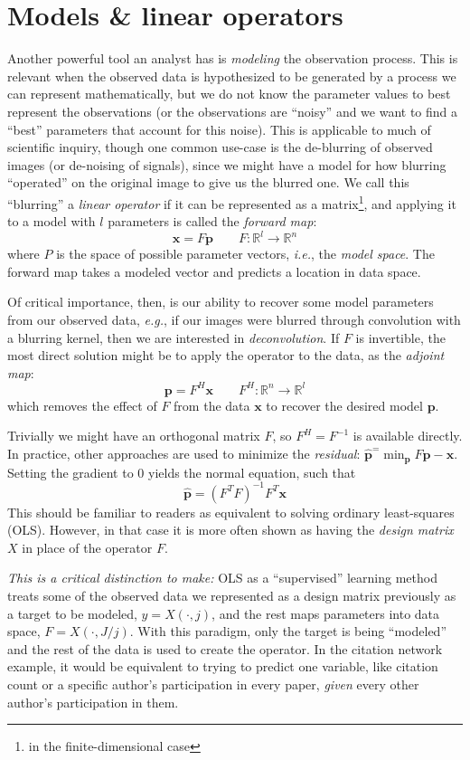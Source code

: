 \documentclass[%
	12pt,
		oneside,
		letterpaper
]{book}
\begin{document}
\section{Models \& linear operators}\label{sec-lin-ops}

Another powerful tool an analyst has is \emph{modeling} the observation process.
This is relevant when the observed data is hypothesized to be generated by a process we can represent mathematically, but we do not know the parameter values to best represent the observations (or the observations are ``noisy'' and we want to find a ``best'' parameters that account for this noise).
This is applicable to much of scientific inquiry, though one common use-case is the de-blurring of observed images (or de-noising of signals), since we might have a model for how blurring ``operated'' on the original image to give us the blurred one.
We call this ``blurring'' a \emph{linear operator} if it can be represented as a matrix\footnote{in the finite-dimensional case}, and applying it to a model with \(l\) parameters is called the \emph{forward map}:
\[\mathbf{x} = F\mathbf{p}\qquad F:\mathbb{R}^{l}\rightarrow \mathbb{R}^n\]
where \(P\) is the space of possible parameter vectors, \emph{i.e.}, the \emph{model space}.
The forward map takes a modeled vector and predicts a location in data space.

Of critical importance, then, is our ability to recover some model parameters from our observed data, \emph{e.g.}, if our images were blurred through convolution with a blurring kernel, then we are interested in \emph{deconvolution}.
If \(F\) is invertible, the most direct solution might be to apply the operator to the data, as the \emph{adjoint map}:
\[ \mathbf{p} = F^H\mathbf{x}\qquad F^H:\mathbb{R}^{n}\rightarrow \mathbb{R}^l\]
which removes the effect of \(F\) from the data \(\mathbf{x}\) to recover the desired model \(\mathbf{p}\).

Trivially we might have an orthogonal matrix \(F\), so \(F^H=F^{-1}\) is available directly.
In practice, other approaches are used to minimize the \emph{residual}: \(\hat{\mathbf{p}}^=\min_{\mathbf{p}} F\mathbf{p}-\mathbf{x}\).
Setting the gradient to 0 yields the normal equation, such that
\[ \hat{\mathbf{p}}=(F^TF)^{-1}F^T\mathbf{x}\]
This should be familiar to readers as equivalent to solving ordinary least-squares (OLS).
However, in that case it is more often shown as having the \emph{design matrix} \(X\) in place of the operator \(F\).

\emph{This is a critical distinction to make:} OLS as a ``supervised'' learning method treats some of the observed data we represented as a design matrix previously as a target to be modeled, \(y=X(\cdot,j)\), and the rest maps parameters into data space, \(F=X(\cdot,J/j)\).
With this paradigm, only the target is being ``modeled'' and the rest of the data is used to create the operator.
In the citation network example, it would be equivalent to trying to predict one variable, like citation count or a specific author's participation in every paper, \emph{given} every other author's participation in them.
\end{document}
